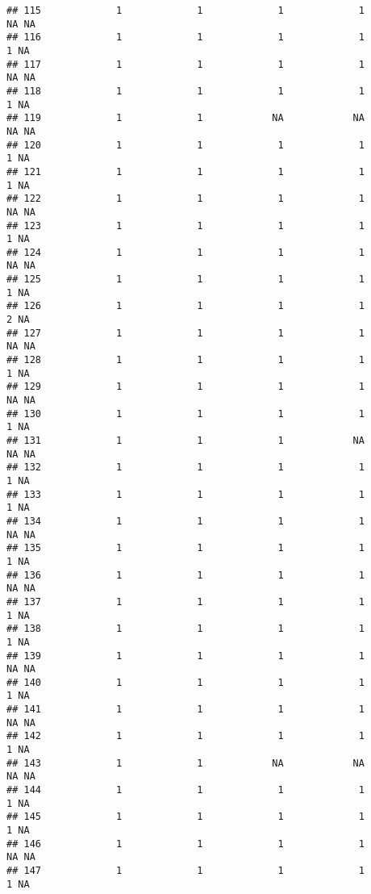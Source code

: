 \documentclass[
]{article}
\begin{document}
\begin{verbatim}
## 115             1             1             1             1            NA NA
## 116             1             1             1             1             1 NA
## 117             1             1             1             1            NA NA
## 118             1             1             1             1             1 NA
## 119             1             1            NA            NA            NA NA
## 120             1             1             1             1             1 NA
## 121             1             1             1             1             1 NA
## 122             1             1             1             1            NA NA
## 123             1             1             1             1             1 NA
## 124             1             1             1             1            NA NA
## 125             1             1             1             1             1 NA
## 126             1             1             1             1             2 NA
## 127             1             1             1             1            NA NA
## 128             1             1             1             1             1 NA
## 129             1             1             1             1            NA NA
## 130             1             1             1             1             1 NA
## 131             1             1             1            NA            NA NA
## 132             1             1             1             1             1 NA
## 133             1             1             1             1             1 NA
## 134             1             1             1             1            NA NA
## 135             1             1             1             1             1 NA
## 136             1             1             1             1            NA NA
## 137             1             1             1             1             1 NA
## 138             1             1             1             1             1 NA
## 139             1             1             1             1            NA NA
## 140             1             1             1             1             1 NA
## 141             1             1             1             1            NA NA
## 142             1             1             1             1             1 NA
## 143             1             1            NA            NA            NA NA
## 144             1             1             1             1             1 NA
## 145             1             1             1             1             1 NA
## 146             1             1             1             1            NA NA
## 147             1             1             1             1             1 NA

\end{verbatim}
\end{document}
